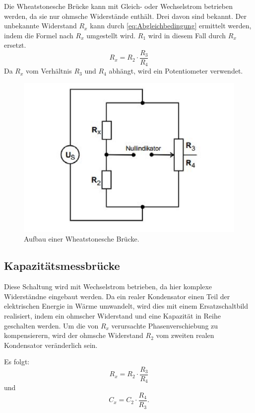 Die Wheatstonesche Brücke kann mit Gleich- oder Wechselstrom betrieben werden, da sie nur ohmsche Widerstände enthält. 
Drei davon sind bekannt.
Der unbekannte Widerstand $R_x$ kann durch \eqref{eq:Abgleichbedingung} ermittelt werden, indem die Formel nach $R_x$ umgestellt wird.
$R_1$ wird in diesem Fall durch $R_x$ ersetzt.
\begin{equation}\label{eqn:wheatstone}
    R_x = R_2 \cdot \frac{R_3}{R_4}
\end{equation}
Da $R_x$ vom Verhältnis $R_3$ und $R_4$ abhängt, wird ein Potentiometer verwendet.

\begin{figure}
    \centering
    \includegraphics[width=\textwidth]{wheatBruecke.pdf}
    \caption{Aufbau einer Wheatstonesche Brücke.\cite{anleitung}}
\end{figure}

\subsection{Kapazitätsmessbrücke}
\label{sec:Kapazität}

Diese Schaltung wird mit Wechselstrom betrieben, da hier komplexe Widerständne eingebaut werden.
Da ein realer Kondensator einen Teil der elektrischen Energie in Wärme umwandelt, wird dies mit einem Ersatzschaltbild realisiert, indem ein ohmscher Widerstand und eine Kapazität in Reihe geschalten werden.
Um die von $R_x$ verursachte Phasenverschiebung zu kompensierern, wird der ohmsche Widerstand $R_2$ vom zweiten realen Kondensator veränderlich sein.

Es folgt:
\begin{equation} \label{eqn:kapazität1}
    R_x = R_2 \cdot \frac{R_3}{R_4}
\end{equation}
und
\begin{equation} \label{eqn:kapazität2}
    C_x = C_2 \cdot \frac{R_4}{R_3} .
\end{equation}

